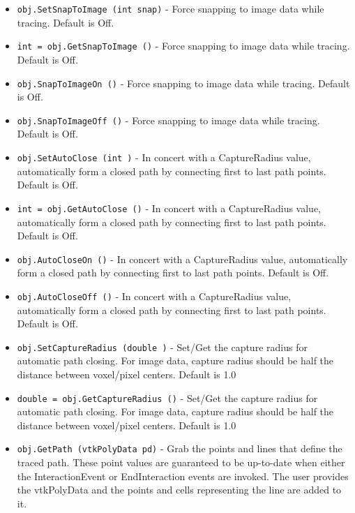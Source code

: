 \begin{itemize}
\item  \verb|obj.SetSnapToImage (int snap)| -  Force snapping to image data while tracing. Default is Off.

\item  \verb|int = obj.GetSnapToImage ()| -  Force snapping to image data while tracing. Default is Off.

\item  \verb|obj.SnapToImageOn ()| -  Force snapping to image data while tracing. Default is Off.

\item  \verb|obj.SnapToImageOff ()| -  Force snapping to image data while tracing. Default is Off.

\item  \verb|obj.SetAutoClose (int )| -  In concert with a CaptureRadius value, automatically
 form a closed path by connecting first to last path points.
 Default is Off.

\item  \verb|int = obj.GetAutoClose ()| -  In concert with a CaptureRadius value, automatically
 form a closed path by connecting first to last path points.
 Default is Off.

\item  \verb|obj.AutoCloseOn ()| -  In concert with a CaptureRadius value, automatically
 form a closed path by connecting first to last path points.
 Default is Off.

\item  \verb|obj.AutoCloseOff ()| -  In concert with a CaptureRadius value, automatically
 form a closed path by connecting first to last path points.
 Default is Off.

\item  \verb|obj.SetCaptureRadius (double )| -  Set/Get the capture radius for automatic path closing.  For image
 data, capture radius should be half the distance between voxel/pixel
 centers.
 Default is 1.0

\item  \verb|double = obj.GetCaptureRadius ()| -  Set/Get the capture radius for automatic path closing.  For image
 data, capture radius should be half the distance between voxel/pixel
 centers.
 Default is 1.0

\item  \verb|obj.GetPath (vtkPolyData pd)| -  Grab the points and lines that define the traced path. These point values
 are guaranteed to be up-to-date when either the InteractionEvent or
 EndInteraction events are invoked. The user provides the vtkPolyData and
 the points and cells representing the line are added to it.


\end{itemize}
